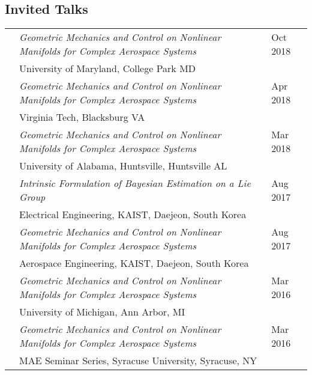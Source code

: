 \documentclass[10pt]{article}
\begin{document}
\subsection*{Invited Talks}
\setlength{\tabcolsep}{0cm}
\begin{tabularx}{\textwidth}{>{\setlength{\hsize}{0.5cm}}X%
>{\setlength{\hsize}{14.3cm}}X%
>{\hfill}X}

& \textit{Geometric Mechanics and Control on Nonlinear Manifolds for Complex Aerospace Systems} & Oct 2018\\
& {University of Maryland}, College Park MD\vspace*{0.1cm}\\

& \textit{Geometric Mechanics and Control on Nonlinear Manifolds for Complex Aerospace Systems} & Apr 2018\\
& {Virginia Tech}, Blacksburg VA\vspace*{0.1cm}\\

& \textit{Geometric Mechanics and Control on Nonlinear Manifolds for Complex Aerospace Systems} & Mar 2018\\
& {University of Alabama, Huntsville}, Huntsville AL\vspace*{0.1cm}\\

& \textit{Intrinsic Formulation of Bayesian Estimation on a Lie Group} & Aug 2017\\
& {Electrical Engineering, KAIST}, Daejeon, South Korea\vspace*{0.1cm}\\

& \textit{Geometric Mechanics and Control on Nonlinear Manifolds for Complex Aerospace Systems} & Aug 2017\\
& {Aerospace Engineering, KAIST}, Daejeon, South Korea\vspace*{0.1cm}\\


& \textit{Geometric Mechanics and Control on Nonlinear Manifolds for Complex Aerospace Systems} & Mar 2016\\
& {University of Michigan}, Ann Arbor, MI\vspace*{0.1cm}\\

& \textit{Geometric Mechanics and Control on Nonlinear Manifolds for Complex Aerospace Systems} & Mar 2016\\
& {MAE Seminar Series, Syracuse University}, Syracuse, NY\vspace*{0.1cm}\\



\end{tabularx}
\end{document}
